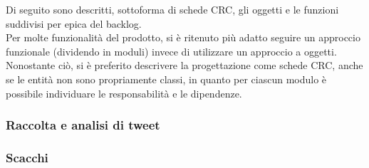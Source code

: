 Di seguito sono descritti, sottoforma di schede CRC, gli oggetti e le funzioni suddivisi per epica del backlog.\\
Per molte funzionalità del prodotto, si è ritenuto più adatto seguire un approccio funzionale (dividendo in moduli) invece di utilizzare un approccio a oggetti.\\
Nonostante ciò, si è preferito descrivere la progettazione come schede CRC, anche se le entità non sono propriamente classi,
in quanto per ciascun modulo è possibile individuare le responsabilità e le dipendenze.

\subsubsection*{Raccolta e analisi di tweet}








\subsubsection*{Scacchi}

